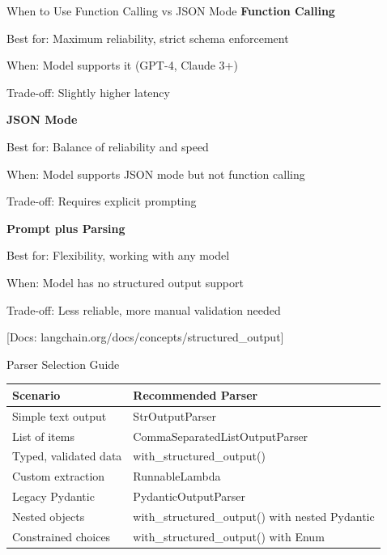 \documentclass[aspectratio=169,11pt]{beamer}
\newcommand{\docref}[1]{{\scriptsize\color{docgray}[Docs: #1]}}
\begin{document}
\begin{frame}{When to Use Function Calling vs JSON Mode}
\textbf{Function Calling}

Best for: Maximum reliability, strict schema enforcement

When: Model supports it (GPT-4, Claude 3+)

Trade-off: Slightly higher latency

\vspace{0.08cm}

\textbf{JSON Mode}

Best for: Balance of reliability and speed

When: Model supports JSON mode but not function calling

Trade-off: Requires explicit prompting

\vspace{0.08cm}

\textbf{Prompt plus Parsing}

Best for: Flexibility, working with any model

When: Model has no structured output support

Trade-off: Less reliable, more manual validation needed

\docref{langchain.org/docs/concepts/structured\_output}
\end{frame}

\begin{frame}{Parser Selection Guide}
\small
\begin{center}
\begin{tabular}{|l|p{8cm}|}
\hline
\textbf{Scenario} & \textbf{Recommended Parser} \\
\hline
Simple text output & StrOutputParser \\
\hline
List of items & CommaSeparatedListOutputParser \\
\hline
Typed, validated data & with\_structured\_output() \\
\hline
Custom extraction & RunnableLambda \\
\hline
Legacy Pydantic & PydanticOutputParser \\
\hline
Nested objects & with\_structured\_output() with nested Pydantic \\
\hline
Constrained choices & with\_structured\_output() with Enum \\
\hline
\end{tabular}
\end{center}
\end{frame}
\end{document}

